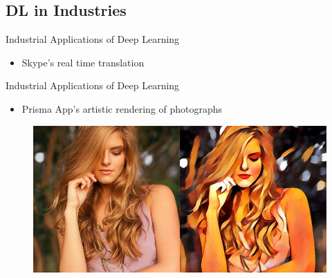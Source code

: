 \documentclass[10pt]{beamer}
\begin{document}
	\subsection{DL in Industries}
	\begin{frame}[t]{Industrial Applications of Deep Learning}
		\begin{itemize}
			\item \large{Skype's real time translation}
		\end{itemize}
	\end{frame}
	\begin{frame}[t]{Industrial Applications of Deep Learning}
		\begin{itemize}
			\item \large{Prisma App's artistic rendering of photographs}
		\end{itemize}
		\begin{figure}
			\includegraphics[width=\linewidth]{images/prisma}
		\end{figure}
	\end{frame}
\end{document}
